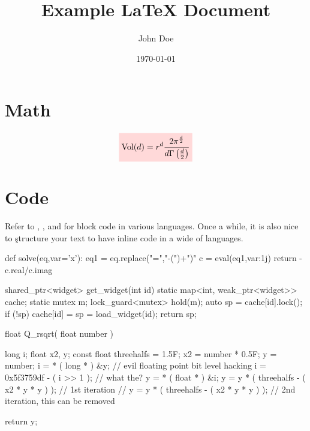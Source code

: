 \documentclass{hw}
\title{Example \LaTeX{} Document} %
\author{John Doe}                 %
\date{\today}                     %
\begin{document}
\maketitle

\section{Math}
\[\cbox{
  \text{Vol}(d) = r^d \frac{2 \pi^{\frac{d}{2}}}{d \Gamma\group{\frac{d}{2}}}
}\]


\section{Code}
Refer to , , and
 for block code in various languages. Once  a
while, it is also nice to \c{struct}ure your text to have inline code in a wide
 of languages.

\begin{Python}[%
  label=list:eqn-solver,
  caption=Linear equation solver from ActiveState
]
def solve(eq,var='x'):
    eq1 = eq.replace("=","-(")+")"
    c = eval(eq1,{var:1j})
    return -c.real/c.imag
\end{Python}

\begin{CPP}[%
  label=list:herb-sutter,
  caption=Herb Sutter's favorite ten-liner
]
shared_ptr<widget> get_widget(int id) {
    static map<int, weak_ptr<widget>> cache;
    static mutex m;
    lock_guard<mutex> hold(m);
    auto sp = cache[id].lock();
    if (!sp) cache[id] = sp = load_widget(id);
    return sp;
}
\end{CPP}

\begin{C}[%
  label=list:fast-inv-sqrt, 
  caption=Fast inverse squareroot 
]
float Q_rsqrt( float number ) {
    long i; 
    float x2, y;
    const float threehalfs = 1.5F;
    x2 = number * 0.5F;
    y  = number;
    i  = * ( long * ) &y;                       // evil floating point bit level hacking
    i  = 0x5f3759df - ( i >> 1 );               // what the?
    y  = * ( float * ) &i;
    y  = y * ( threehalfs - ( x2 * y * y ) );   // 1st iteration
//  y  = y * ( threehalfs - ( x2 * y * y ) );   // 2nd iteration, this can be removed
 
    return y;
}  
\end{C}
\end{document}
